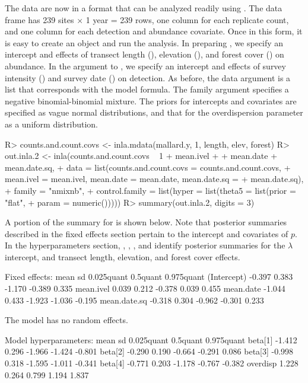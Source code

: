 \documentclass[codesnippet]{jss}
\begin{document}
The data are now in a format that can be analyzed readily using 
. The data frame has 239 sites $\times$ 1 year = 239 rows, one 
column for each replicate count, and one column for each detection and 
abundance covariate. Once in this form, it is easy to create an 
 object and run the analysis. In preparing 
, we specify an intercept and effects of 
transect length (), elevation (), and forest cover 
() on abundance. In the  argument to , 
we specify an intercept and effects of survey intensity () and 
survey date () on detection. As before, the data argument is a 
list that corresponds with the model formula. The family argument specifies 
a negative binomial-binomial mixture. The priors for intercepts and 
covariates are specified as vague normal distributions, and that for the 
overdispersion parameter as a uniform distribution. 

\begin{CodeInput}
R> counts.and.count.covs <- inla.mdata(mallard.y, 1, length, elev, forest)
R> out.inla.2 <- inla(counts.and.count.covs ~ 1 + mean.ivel +
+    mean.date + mean.date.sq, 
+    data = list(counts.and.count.covs = counts.and.count.covs, 
+      mean.ivel = mean.ivel, mean.date = mean.date, mean.date.sq = 
+      mean.date.sq), 
+    family = "nmixnb", 
+    control.family = list(hyper = list(theta5 = list(prior = "flat",
+      param = numeric()))))
R> summary(out.inla.2, digits = 3)
\end{CodeInput}

A portion of the summary for  is shown below. Note that posterior summaries described in the fixed effects section pertain to the intercept and covariates of $p$. In the hyperparameters section, , , , and  identify posterior summaries for the $\lambda$ intercept, and transect length, elevation, and forest cover effects.

\begin{CodeOutput}
Fixed effects:
               mean    sd 0.025quant  0.5quant  0.975quant
(Intercept)  -0.397 0.383     -1.170    -0.389       0.335
mean.ivel     0.039 0.212     -0.378     0.039       0.455
mean.date    -1.044 0.433     -1.923    -1.036      -0.195
mean.date.sq -0.318 0.304     -0.962    -0.301       0.233

The model has no random effects.

Model hyperparameters:
             mean     sd  0.025quant  0.5quant  0.975quant
beta[1]    -1.412  0.296      -1.966    -1.424      -0.801 
beta[2]    -0.290  0.190      -0.664    -0.291       0.086
beta[3]    -0.998  0.318      -1.595    -1.011      -0.341
beta[4]    -0.771  0.203      -1.178    -0.767      -0.382
overdisp    1.228  0.264       0.799     1.194       1.837
\end{CodeOutput}
\end{document}
